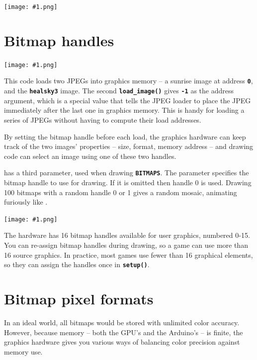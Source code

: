 \documentclass[10pt]{book}
\makeatletter
\newcommand{\png}[1]{
\begin{center}
\texttt{[image: \#1.png]}
\end{center}
}
\newcommand{\mach}[1]{\texttt{\textbf{#1}}}
\newcommand{\cmdidx}[1]{
\index{#1@\mach{#1()}}
}
\newcommand{\dcmd}[1]{\cmdidx{#1}\nameref{#1}}
\makeatother
\begin{document}



\png{0009}
\clearpage

\section{Bitmap handles}
\label{bitmaphandles}

\png{jpeg2}


This code loads two JPEGs into graphics memory -- a sunrise image at address \mach{0}, and the \mach{healsky3} image.
The second \mach{load\_image()} gives \mach{-1} as the address argument, which is a special value that
tells the JPEG loader to place the JPEG immediately after the last one in graphics memory.
This is handy for loading a series of JPEGs without having to compute their load addresses.

By setting the bitmap handle before each load, the graphics hardware can keep track of the two images' properties -- size, format, memory address -- 
and drawing code can select an image using one of these two handles.

\dcmd{Vertex2ii} has a third parameter, used when drawing \mach{BITMAPS}.
The parameter specifies the bitmap handle to use for drawing.
If it is omitted then handle 0 is used.  
Drawing 100 bitmaps with a random handle 0 or 1
gives a random mosaic, animating furiously like .
\png{0010}

The hardware has 16 bitmap handles available for user graphics, numbered 0-15.
You can re-assign bitmap handles during drawing, so a game can use more than 16 source graphics.
In practice, most games use fewer than 16 graphical elements, so they can assign the handles once in \mach{setup()}.

\newpage
\section{Bitmap pixel formats}

In an ideal world, all bitmaps would be stored with unlimited color accuracy.
However, because memory -- both the GPU's and the Arduino's -- is finite,
the graphics hardware gives you various ways of balancing color precision against memory use.
\vspace{10pt}
\newcommand{\fmline}[3]{
\index{#1 bitmap format@\mach{#1} bitmap format}
\index{bitmap format!#1@\mach{#1}}
\textbf{\large\mach{#1}} &
#3
& {\raisebox{-\height+8pt}{\texttt{[image: \#2]}}} \\
}
\end{document}
